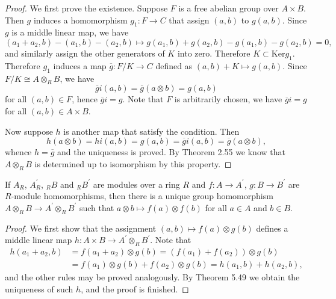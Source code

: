 \begin{proof}
We first prove the existence. Suppose $F$ is a free abelian group over $A\times B$. Then $g$ induces a homomorphism $g_1:F\to C$ that assign $(a,b)$ to $g(a,b)$. Since $g$ is a middle linear map, we have 
$$
\left( a_1+a_2,b \right) -\left( a_1,b \right) -\left( a_2,b \right) \mapsto g\left( a_1,b \right) +g\left( a_2,b \right) -g\left( a_1,b \right) -g\left( a_2,b \right) =0,
$$
and similarly assign the other generators of $K$ into zero. Therefore $K\subset\mathrm{Ker}g_1$. Therefore $g_1$ induces a map $\overline{g}:F/K\to C$ defined as $(a,b)+K\mapsto g(a,b)$. Since $F/K\cong A\otimes_RB$, we have 
$$
\overline{g}i\left( a,b \right) =\overline{g}\left( a\otimes b \right) =g\left( a,b \right) 
$$
for all $(a,b)\in F$, hence $\overline{g}i=g$. Note that $F$ is arbitrarily chosen, we have $\overline{g}i=g$ for all $(a,b)\in A\times B$.\par
Now suppose $h$ is another map that satisfy the condition. Then 
$$
h\left( a\otimes b \right) =hi\left( a,b \right) =g\left( a,b \right) =\overline{g}i\left( a,b \right) =\overline{g}\left( a\otimes b \right) ,
$$
whence $h=\overline{g}$ and the uniqueness is proved. By Theorem 2.55 we know that $A\otimes_RB$ is determined up to isomorphism by this property.
\end{proof}
\begin{corollary}
If $A_R$, $A_R^\prime$, $_RB$ and $_RB^\prime$ are modules over a ring $R$ and $f:A\to A^\prime$, $g:B\to B^\prime$ are $R$-module homomorphisms, then there is a unique group homomorphism $A\otimes_RB\to A^\prime\otimes_RB^\prime$ such that $a\otimes b\mapsto f(a)\otimes f(b)$ for all $a\in A$ and $b\in B$.
\end{corollary}
\begin{proof}
We first show that the assignment $(a,b)\mapsto f(a)\otimes g(b)$ defines a middle linear map $h:A\times B\to A^\prime\otimes_RB^\prime$. Note that 
$$
\begin{aligned}
h\left( a_1+a_2,b \right) &=f\left( a_1+a_2 \right) \otimes g\left( b \right) =\left( f\left( a_1 \right) +f\left( a_2 \right) \right) \otimes g\left( b \right) 
\\
&=f\left( a_1 \right) \otimes g\left( b \right) +f\left( a_2 \right) \otimes g\left( b \right) =h\left( a_1,b \right) +h\left( a_2,b \right) ,
\end{aligned}
$$
and the other rules may be proved analogously. By Theorem 5.49 we obtain the uniqueness of such $h$, and the proof is finished.
\end{proof}

